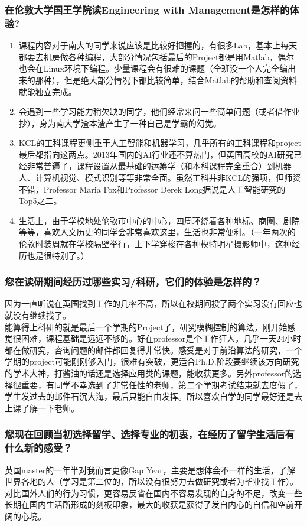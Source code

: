 \documentclass[a4paper,UTF8]{book}
\begin{document}
    \subsubsection*{在伦敦大学国王学院读Engineering with Management是怎样的体验?}
        \begin{enumerate}[itemindent=0pt,itemsep=0pt,parsep=0pt]
            \item 课程内容对于南大的同学来说应该是比较好把握的，有很多Lab，基本上每天都要去机房做各种编程，大部分情况包括最后的Project都是用Matlab，偶尔也会在Linux环境下编程。少量课程会有很难的课题（全班没一个人完全编出来的那种），但是绝大部分情况下都比较简单，结合Matlab的帮助和查阅资料就能独立完成。
            \item 会遇到一些学习能力稍欠缺的同学，他们经常来问一些简单问题（或者借作业抄），身为南大学渣本渣产生了一种自己是学霸的幻觉。
            \item KCL的工科课程更侧重于人工智能和机器学习，几乎所有的工科课程和project最后都指向这两点。2013年国内的AI行业还不算热门，但英国高校的AI研究已经非常普遍了，课程设置从最基础的运筹学（和本科课程完全重合）到机器人、计算机视觉、模式识别等等非常全面。虽然工科并非KCL的强项，但师资不错，Professor Maria Fox和Professor Derek Long据说是人工智能研究的Top5之二。
            \item 生活上，由于学校地处伦敦市中心的中心，四周环绕着各种地标、商圈、剧院等等，喜欢人文历史的同学会非常喜欢这里，生活也非常便利。（一年两次的伦敦时装周就在学校隔壁举行，上下学穿梭在各种模特明星摄影师中，这种经历也是很特别了。）
        \end{enumerate}

    \subsubsection*{您在读研期间经历过哪些实习/科研，它们的体验是怎样的？}
    因为一直听说在英国找到工作的几率不高，所以在校期间投了两个实习没有回应也就没有继续找了。\\
    能算得上科研的就是最后一个学期的Project了，研究模糊控制的算法，刚开始感觉很困难，课程基础是远远不够的。好在professor是个工作狂人，几乎一天24小时都在做研究，咨询问题的邮件都回复得非常快。感受是对于前沿算法的研究，一个学期的project可能刚刚够入门，很难有突破，更适合Ph.D.阶段要继续该方向研究的学术大神，打酱油的话还是选择应用类的课题，能收获更多。另外professor的选择很重要，有同学不幸选到了非常任性的老师，第二个学期考试结束就去度假了，学生发过去的邮件石沉大海，最后只能自由发挥。所以喜欢自学的同学最好还是去上课了解一下老师。

    \subsubsection*{您现在回顾当初选择留学、选择专业的初衷，在经历了留学生活后有什么新的感受？}
    英国master的一年半对我而言更像Gap Year，主要是想体会不一样的生活，了解世界各地的人（学习是第二位的，所以没有很努力去做研究或者为毕业找工作）。对比国外人们的行为习惯，更容易反省在国内不容易发现的自身的不足，改变一些长期在国内生活所形成的刻板印象，最大的收获是获得了发自内心的自信和空前开阔的心境。
\end{document}
